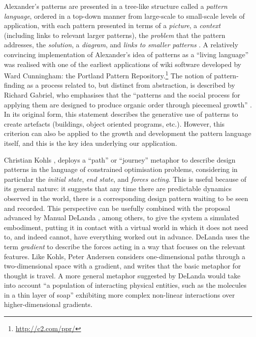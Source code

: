 \documentclass{llncs}
\begin{document}
Alexander's patterns are presented in a tree-like structure called a
\emph{pattern language}, ordered in a top-down manner from large-scale
to small-scale levels of application, with each pattern presented in
terms of a \emph{picture}, a \emph{context} (including links to
relevant larger patterns), the \emph{problem} that the pattern
addresses, the \emph{solution}, a \emph{diagram}, and \emph{links to
  smaller patterns} \cite[pp. x-xi]{alexander1977pattern}.
%
A relatively convincing implementation of
Alexander's idea of patterns as a ``living
  language''
\cite[p. xvii]{alexander1977pattern} was realised
with one of the earliest applications of wiki
software developed by Ward Cunningham: the
Portland Pattern
Repository.\footnote{\url{http://c2.com/ppr/}}
The notion of pattern-finding as a process
related to, but distinct from abstraction, is
described by Richard Gabriel, who emphasises that
the ``patterns and the social process for
  applying them are designed to produce organic
  order through piecemeal growth''
\cite[p. 31]{gabriel1996patterns}.
%
In its original form, this statement describes the generative use of
patterns to create artefacts (buildings, object oriented programs,
etc.).  However, this criterion can also be applied to the growth and
development the pattern language itself, and this is the key idea
underlying our application.

Christian Kohls \cite{kohls2010structure,kohls2011structure}, deploys
a ``path'' or ``journey'' metaphor to describe design patterns in the
language of constrained optimisation problems, considering in
particular the \emph{initial state}, \emph{end state}, and
\emph{forces acting}.  This is useful because of its general nature:
it suggests that any time there are predictable dynamics observed in
the world, there is a corresponding design pattern waiting to be seen
and recorded.  This perspective can be usefully combined with the
proposal advanced by Manual DeLanda \cite{delanda2011philosophy},
among others, to give the system a simulated embodiment, putting it in
contact with a virtual world in which it does not need to, and indeed
cannot, have everything worked out in advance.  DeLanda uses the term
\emph{gradient} to describe the forces acting in a way that focuses on
the relevant features.  Like Kohls, Peter Andersen
\cite{andersen2002dynamic} considers one-dimensional paths through a
two-dimensional space with a gradient, and writes that the basic
metaphor for thought is travel.  A more general metaphor suggested
by DeLanda would take into account
%
``a population of interacting physical entities, such as the molecules
in a thin layer of soap'' \cite{delanda2005deleuze} exhibiting more
complex non-linear interactions over higher-dimensional gradients.
\end{document}
